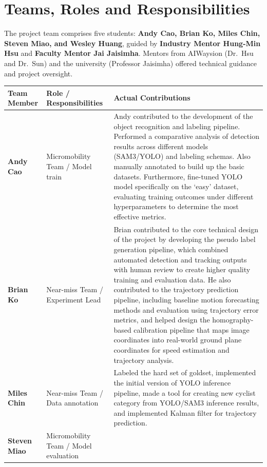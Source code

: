 \documentclass[12pt,letterpaper]{article}
\begin{document}
\section{Teams, Roles and Responsibilities}

The project team comprises five students: \textbf{Andy Cao, Brian Ko, Miles Chin, Steven Miao, and Wesley Huang}, guided by \textbf{Industry Mentor Hung-Min Hsu} and \textbf{Faculty Mentor Jai Jaisimha}. Mentors from AIWaysion (Dr.\ Hsu and Dr.\ Sun) and the university (Professor Jaisimha) offered technical guidance and project oversight.

\begin{longtable}{|p{2.5cm}|p{3.5cm}|p{8cm}|}
\hline
\textbf{Team Member} & \textbf{Role / Responsibilities} & \textbf{Actual Contributions} \\
\hline
\endhead
\textbf{Andy Cao} & Micromobility Team / Model train &
Andy contributed to the development of the object recognition and labeling pipeline. Performed a comparative analysis of detection results across different models (SAM3/YOLO) and labeling schemas. Also manually annotated to build up the basic datasets. Furthermore, fine-tuned YOLO model specifically on the `easy' dataset, evaluating training outcomes under different hyperparameters to determine the most effective metrics. \\
\hline
\textbf{Brian Ko} & Near-miss Team / Experiment Lead &
Brian contributed to the core technical design of the project by developing the pseudo label generation pipeline, which combined automated detection and tracking outputs with human review to create higher quality training and evaluation data. He also contributed to the trajectory prediction pipeline, including baseline motion forecasting methods and evaluation using trajectory error metrics, and helped design the homography-based calibration pipeline that maps image coordinates into real-world ground plane coordinates for speed estimation and trajectory analysis. \\
\hline
\textbf{Miles Chin} & Near-miss Team / Data annotation &
Labeled the hard set of goldset, implemented the initial version of YOLO inference pipeline, made a tool for creating new cyclist category from YOLO/SAM3 inference results, and implemented Kalman filter for trajectory prediction. \\
\hline
\textbf{Steven Miao} & Micromobility Team / Model evaluation &

\end{longtable}
\end{document}
